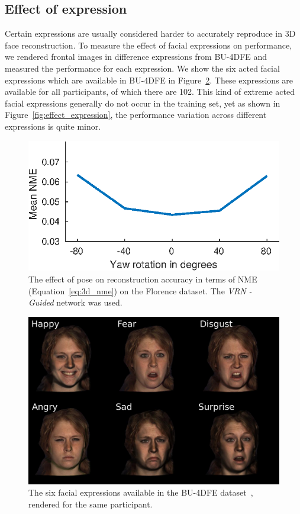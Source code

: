 \subsection{Effect of expression} Certain expressions are usually
considered harder to accurately reproduce in 3D face reconstruction.
To measure the effect of facial expressions on performance, we
rendered frontal images in difference expressions from BU-4DFE and
measured the performance for each expression. We show the six acted
facial expressions which are available in BU-4DFE in
Figure~\ref{fig:bu4dfe_expressions}. These expressions are available
for all participants, of which there are 102. This kind of extreme
acted facial expressions generally do not occur in the training set,
yet as shown in Figure~\ref{fig:effect_expression}, the performance
variation across different expressions is quite minor.

\begin{figure}
  \centering
  \includegraphics[width=0.6\linewidth]{curves/ablation_pose.eps}
  \caption[Effect of pose]{The effect of pose on reconstruction
    accuracy in terms of NME (Equation~\ref{eq:3d_nme}) on the
    Florence dataset. The \textit{VRN - Guided} network was used.}
  \label{fig:effect_pose}
\end{figure}

\begin{figure}
  \centering
  \includegraphics[width=0.8\linewidth]{img/bu4dfe_expressions.pdf}
  \caption[The six facial expressions available in the BU-4DFE
  dataset]{The six facial expressions available in the BU-4DFE
    dataset~\cite{yin2008high}, rendered for the same participant.}
  \label{fig:bu4dfe_expressions}
\end{figure}

